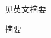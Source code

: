 \begin{abstractZh}
    见英文摘要
	
    \begin{keywordsZh}
        摘要
    \end{keywordsZh}
\end{abstractZh}
